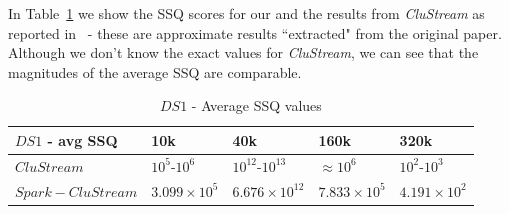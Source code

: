 In Table~\ref{tab:DS1quality} we show the SSQ scores for our \our and the results from \emph{CluStream} as reported in~\cite{clustreamOrig} - these are approximate results ``extracted" from the original paper.
Although we don't know the exact values for \emph{CluStream}, we can see that the magnitudes of the average SSQ are comparable.

\begin{table}[t]
\centering
  \begin{tabular}{|l|l|l|l|l|}\hline
\textbf{$DS1$ - avg SSQ} & \textbf{10k} & \textbf{40k} & \textbf{160k} & \textbf{320k}\\\hline
$CluStream$ & $10^5$-$10^6$ & $10^{12}$-$10^{13}$ & $\approx 10^6$ & $10^2$-$10^3$\\\hline
$Spark-CluStream$ & $3.099\times10^5$ & $6.676\times10^{12}$ & $7.833\times10^5$ & $4.191\times10^2$\\\hline
  \end{tabular}
  \caption{$DS1$ - Average SSQ values}
  \label{tab:DS1quality}
\end{table}

